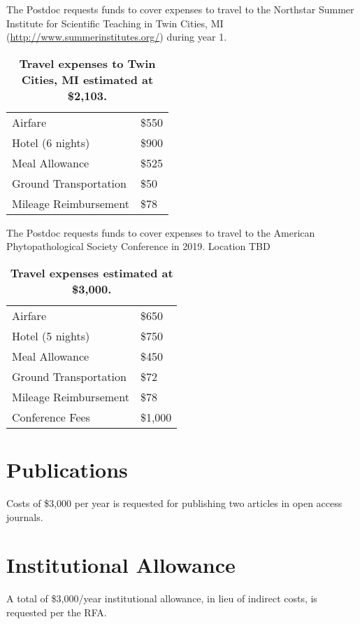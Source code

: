 \documentclass[12pt,letterpaper]{article}
\begin{document}
The Postdoc requests funds to cover expenses to travel to the Northstar Summer Institute for Scientific Teaching in Twin Cities, MI (\url{http://www.summerinstitutes.org/}) during year 1.




\begin{table}[h!]
\centering
\begin{tabular}{ll}
\hline
	Airfare	& \$550 \\
	Hotel (6 nights) 	& \$900 \\
	Meal Allowance	& \$525 \\
	Ground Transportation	& \$50 \\
	Mileage Reimbursement	& \$78 \\\hline
\end{tabular}
\caption{\textbf{Travel expenses to Twin Cities, MI estimated at \$2,103.}}
\end{table}

The Postdoc requests funds to cover expenses to travel to the American Phytopathological Society Conference in 2019.  Location TBD


\begin{table}[h!]
\centering
\begin{tabular}{ll}
\hline
	Airfare	& \$650 \\
	Hotel (5 nights) 	& \$750 \\
	Meal Allowance	& \$450 \\
	Ground Transportation	& \$72 \\
	Mileage Reimbursement	& \$78 \\
	Conference Fees	& \$1,000\\\hline
\end{tabular}
\caption{\textbf{Travel expenses estimated at \$3,000.}}
\end{table}


\section{Publications}
Costs of \$3,000 per year is requested for publishing two articles in open access journals.  

\section{Institutional Allowance}
A total of \$3,000/year institutional allowance, in lieu of indirect costs, is requested per the RFA.  
\end{document}
